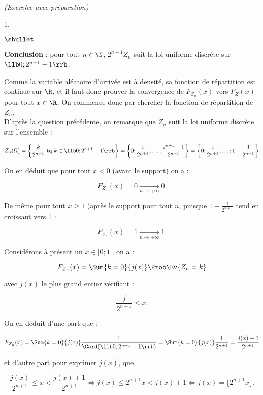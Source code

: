 \documentclass[11pt]{article}%
\begin{document}
\begin{exercice}{\it (Exercice avec préparation)}
\begin{noliste}{1.}
\begin{noliste}{$\sbullet$}
 \item \textbf{Conclusion} : pour tout $n \in \N$, $ 2^{n + 1} Z_{n}$
suit la loi uniforme discrète sur $\llb 0 ; 2^{n + 1} - 1 \rrb$. \\

 \end{noliste}

 \item Comme la variable aléatoire d'arrivée est à densité, sa fonction
de répartition est continue sur $\R$, et il faut donc prouver la
convergence de $F_{ Z_{n} } (x)$ vers $F_{Z} (x)$ pour tout $x \in \R$.
On commence donc par chercher la fonction de répartition de $Z_{n}$. \\

 D'après la question précédente, on remarque que $Z_{n}$ suit la loi
uniforme discrète sur l'ensemble : 
 
\[
 Z_{n} ( \Omega ) = \left\{ \frac{ k }{ 2^{n + 1} } \text{ tq } k \in
\llb 0 ; 2^{n + 1} - 1 \rrb \right\} = \left\{ 0 ; \frac{ 1 }{ 2^{n +
1} } ; \dots ; \frac{ 2^{n + 1} - 1 }{ 2^{ n + 1 } } \right\} = \left\{
0 ; \frac{ 1 }{ 2^{n + 1} } ; \dots ; 1 - \frac{ 1 }{ 2^{ n + 1 } }
\right\} 
\]

 On en déduit que pour tout $x < 0$ (avant le support) on a : 
 
\[
 F_{ Z_{n} } (x) = 0 \xrightarrow[ n \rightarrow + \infty ]{} 0. 
\]

 De même pour tout $x \geq 1$ (après le support pour tout $n$, puisque
$ 1 - \frac{ 1 }{ 2^{n + 1} }$ tend en croissant vers 1 : 
 
\[
 F_{ Z_{n} } (x) = 1 \xrightarrow[ n \rightarrow + \infty ]{} 1. 
\]

 Considérons à présent un $x \in [ 0 ; 1 [$, on a : 
 
\[
 F_{ Z_{n} } (x) = \Sum{ k = 0 }{ j (x) } \Prob\Ev{ Z_{n} = k } 
\]

 avec $j(x)$ le plus grand entier vérifiant : 
 
\[
 \frac{ j }{ 2^{n + 1} } \leq x. 
\]

 On en déduit d'une part que : 
 
\[
 F_{ Z_{n} } (x) = \Sum{ k = 0 }{ j (x) } \frac{ 1 }{ \Card ( \llb 0 ;
2^{n + 1} - 1 \rrb ) } = \Sum{ k = 0 }{ j (x) } \frac{ 1 }{ 2^{n + 1} }
= \frac{ j(x) + 1 }{ 2^{ n + 1 } } 
\]

 et d'autre part pour exprimer $j(x)$, que 
 
\[
 \frac{ j(x) }{ 2^{ n + 1 } } \leq x < \frac{ j(x) + 1 }{ 2^{n + 1} }
\Longleftrightarrow j(x) \leq 2^{n + 1} x < j(x) + 1
\Longleftrightarrow j(x) = \lfloor 2^{ n + 1 } x \rfloor. 
\]


\end{noliste}
\end{exercice}
\end{document}
